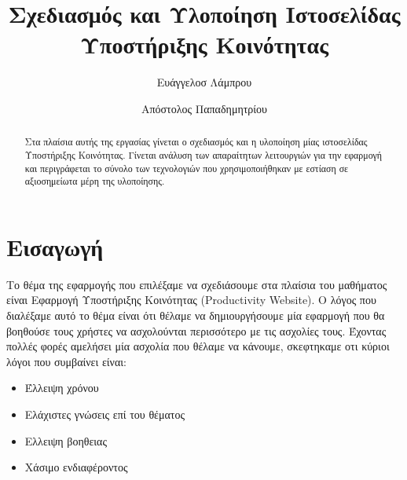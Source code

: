 \documentclass[nonacm, language=english, language=greek]{acmart}
\newcommand{\en}[1]{\textlatin{#1}}
\begin{document}
\title{Σχεδιασμός και Υλοποίηση Ιστοσελίδας Υποστήριξης Κοινότητας}

\author{Ευάγγελοσ Λάμπρου}
\orcid{}

\author{Απόστολος Παπαδημητρίου}

\begin{abstract}
    Στα πλαίσια αυτής της εργασίας γίνεται ο σχεδιασμός και η υλοποίηση μίας 
    ιστοσελίδας Υποστήριξης Κοινότητας. Γίνεται ανάλυση των απαραίτητων 
    λειτουργιών για την εφαρμογή και περιγράφεται το σύνολο των τεχνολογιών 
    που χρησιμοποιήθηκαν με εστίαση σε αξιοσημείωτα μέρη της υλοποίησης.
\end{abstract}

\maketitle

\section{Εισαγωγή}

Το θέμα της εφαρμογής που επιλέξαμε να σχεδιάσουμε στα πλαίσια του μαθήματος είναι Εφαρμογή Υποστήριξης Κοινότητας (\en{Productivity Website}). Ο λόγος που διαλέξαμε αυτό το θέμα είναι ότι θέλαμε να δημιουργήσουμε μία εφαρμογή που θα βοηθούσε τους χρήστες να ασχολούνται περισσότερο με τις ασχολίες τους.
Έχοντας πολλές φορές αμελήσει μία ασχολία που θέλαμε να κάνουμε, σκεφτηκαμε οτι κύριοι λόγοι που συμβαίνει είναι:
\begin{itemize}
    \item Έλλειψη χρόνου
    \item Ελάχιστες γνώσεις επί του θέματος
    \item Ελλειψη βοηθειας
    \item Χάσιμο ενδιαφέροντος
\end{itemize}
\end{document}
